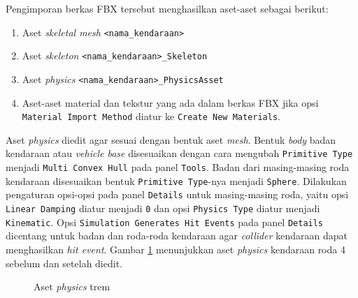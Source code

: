 Pengimporan berkas FBX tersebut menghasilkan aset-aset sebagai berikut:

\begin{enumerate}
    \item Aset \textit{skeletal mesh} \verb|<nama_kendaraan>|
    \item Aset \textit{skeleton} \verb|<nama_kendaraan>_Skeleton|
    \item Aset \textit{physics} \verb|<nama_kendaraan>_PhysicsAsset|
    \item Aset-aset material dan tekstur yang ada dalam berkas FBX jika opsi
    \verb|Material Import Method| diatur ke \verb|Create New Materials|.
\end{enumerate}

Aset \textit{physics} diedit agar sesuai dengan bentuk aset \textit{mesh}.
Bentuk \textit{body} badan kendaraan atau \textit{vehicle base} disesuaikan
dengan cara mengubah \verb|Primitive Type| menjadi \verb|Multi Convex Hull|
pada panel \verb|Tools|. Badan dari masing-masing roda kendaraan disesuaikan
bentuk \verb|Primitive Type|-nya menjadi \verb|Sphere|. Dilakukan pengaturan
opsi-opsi pada panel \verb|Details| untuk masing-masing roda, yaitu opsi
\verb|Linear Damping| diatur menjadi \verb|0| dan opsi \verb|Physics Type|
diatur menjadi \verb|Kinematic|. Opsi \verb|Simulation Generates Hit Events|
pada panel \verb|Details| dicentang untuk badan dan roda-roda kendaraan agar
\textit{collider} kendaraan dapat menghasilkan \textit{hit event}. Gambar
\ref{fig:physics-asset-4wheeled} menunjukkan aset \textit{physics} kendaraan
roda 4 sebelum dan setelah diedit.

\begin{figure}[!ht]
    \centering
    \hfill
    \caption{Aset \textit{physics} trem}
    \label{fig:physics-asset-4wheeled}
\end{figure}

